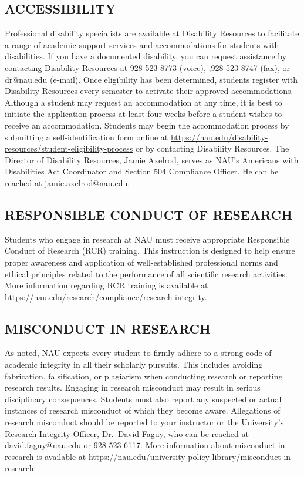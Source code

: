 \documentclass[
  letterpaper,
  DIV=11,
  numbers=noendperiod]{scrreprt}
\begin{document}
\hypertarget{accessibility}{%
\subsection{ACCESSIBILITY}\label{accessibility}}

Professional disability specialists are available at Disability
Resources to facilitate a range of academic support services and
accommodations for students with disabilities. If you have a documented
disability, you can request assistance by contacting Disability
Resources at 928-523-8773 (voice), ,928-523-8747 (fax), or dr@nau.edu
(e-mail). Once eligibility has been determined, students register with
Disability Resources every semester to activate their approved
accommodations. Although a student may request an accommodation at any
time, it is best to initiate the application process at least four weeks
before a student wishes to receive an accommodation. Students may begin
the accommodation process by submitting a self-identification form
online at
\url{https://nau.edu/disability-resources/student-eligibility-process}
or by contacting Disability Resources. The Director of Disability
Resources, Jamie Axelrod, serves as NAU's Americans with Disabilities
Act Coordinator and Section 504 Compliance Officer. He can be reached at
jamie.axelrod@nau.edu.

\hypertarget{responsible-conduct-of-research}{%
\subsection{RESPONSIBLE CONDUCT OF
RESEARCH}\label{responsible-conduct-of-research}}

Students who engage in research at NAU must receive appropriate
Responsible Conduct of Research (RCR) training. This instruction is
designed to help ensure proper awareness and application of
well-established professional norms and ethical principles related to
the performance of all scientific research activities. More information
regarding RCR training is available at
\url{https://nau.edu/research/compliance/research-integrity}.

\hypertarget{misconduct-in-research}{%
\subsection{MISCONDUCT IN RESEARCH}\label{misconduct-in-research}}

As noted, NAU expects every student to firmly adhere to a strong code of
academic integrity in all their scholarly pursuits. This includes
avoiding fabrication, falsification, or plagiarism when conducting
research or reporting research results. Engaging in research misconduct
may result in serious disciplinary consequences. Students must also
report any suspected or actual instances of research misconduct of which
they become aware. Allegations of research misconduct should be reported
to your instructor or the University's Research Integrity Officer,
Dr.~David Faguy, who can be reached at david.faguy@nau.edu or
928-523-6117. More information about misconduct in research is available
at
\url{https://nau.edu/university-policy-library/misconduct-in-research}.
\end{document}
